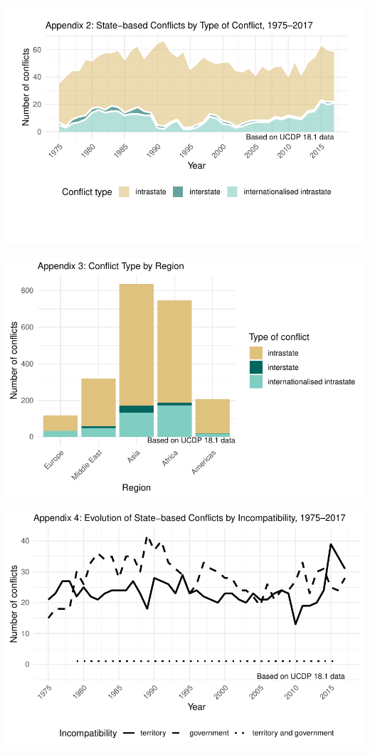 \documentclass[
]{article}
\begin{document}
\includegraphics{Dissertation_writeup_files/figure-latex/Conflict type (Appendix 2)-1.pdf}

\includegraphics{Dissertation_writeup_files/figure-latex/Bivariate analysis between conflict type and region (Appendix 3)-1.pdf}

\includegraphics{Dissertation_writeup_files/figure-latex/Incompatibility (Appendix 4)-1.pdf}
\end{document}
